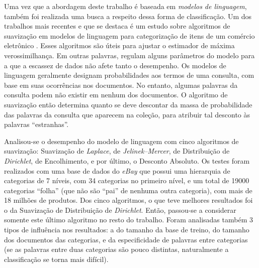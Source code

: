 \documentclass[
	12pt,				%
	openright,			%
	oneside,
	a4paper,				%
	english,				%
	brazil				%
]{abntex2/abntex2} %
\begin{document}
	\pagebreak
	Uma vez que a abordagem deste trabalho é baseada em \emph{modelos de linguagem}, também foi realizada uma busca a respeito dessa forma de classificação. Um dos trabalhos mais recentes e que se destaca é um estudo sobre algoritmos de suavização em modelos de linguagem para categorização de itens de um comércio eletrônico \cite{ShenRMS12}. Esses algoritmos são úteis para ajustar o estimador de máxima verossimilhança. Em outras palavras, regulam alguns parâmetros do modelo para a que a escassez de dados não afete tanto o desempenho. Os modelos de linguagem geralmente designam probabilidades aos termos de uma consulta, com base em suas ocorrências nos documentos. No entanto, algumas palavras da consulta podem não existir em nenhum dos documentos. O algoritmo de suavização então determina quanto se deve descontar da massa de probabilidade das palavras da consulta que aparecem na coleção, para atribuir tal desconto às palavras ``estranhas''.

	Analisou-se o desempenho do modelo de linguagem com cinco algoritmos de suavização: Suavização de \emph{Laplace}, de \emph{Jelinek–Mercer}, de Distribuição de \emph{Dirichlet}, de Encolhimento, e por último, o Desconto Absoluto. Os testes foram realizados com uma base de dados do \emph{eBay} que possui uma hierarquia de categorias de 7 níveis, com 34 categorias no primeiro nível, e um total de 19000 categorias ``folha'' (que não são ``pai'' de nenhuma outra categoria), com mais de 18 milhões de produtos. Dos cinco algoritmos, o que teve melhores resultados foi o da Suavização de Distribuição de \emph{Dirichlet}. Então, passou-se a considerar somente este último algoritmo no resto do trabalho. Foram analisadas também 3 tipos de influência nos resultados: a do tamanho da base de treino, do tamanho dos documentos das categorias, e da especificidade de palavras entre categorias (se as palavras entre duas categorias são pouco distintas, naturalmente a classificação se torna mais difícil).



\end{document}
